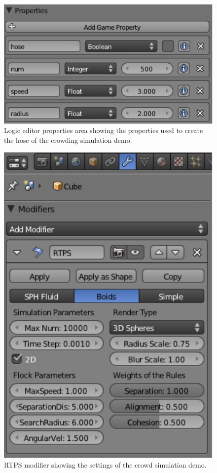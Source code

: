 \begin{figure}[htbp]
\begin{center}
\includegraphics[scale=0.7]{figures/demo_crowds_prop.pdf}
\caption{Logic editor properties area showing the properties used to create the hose of the crowding simulation demo.}
\label{crowd_prop}
\end{center}
\end{figure}

\begin{figure}[htbp]
\begin{center}
\includegraphics[scale=0.8]{figures/demo_crowds_modifier.pdf}
\caption{RTPS modifier showing the settings of the crowd simulation demo.}
\label{crowd_modifier}
\end{center}
\end{figure}

